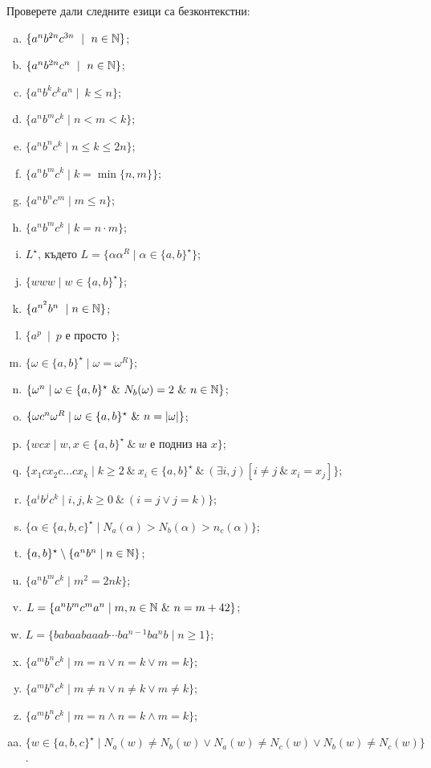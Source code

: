 \begin{problem}
  Проверете дали следните езици са безконтекстни:
  \begin{enumerate}[a)]
  \item
    $\{a^nb^{2n}c^{3n}\ \mid\ n\in\Nat\}$;
  \item
    $\{a^nb^{2n}c^{n}\ \mid\ n\in\Nat\}$;
  \item
    $\{a^nb^kc^ka^n\mid\ k \leq n\}$;
  \item
    $\{a^nb^mc^k\mid n < m < k\}$;
  \item
    $\{a^nb^nc^k\mid n \leq k \leq 2n\}$;
  \item
    $\{a^nb^mc^k\mid k = \min\{n,m\}\}$;
  \item
    $\{a^nb^nc^m\mid m \leq n\}$;
  \item
    $\{a^nb^mc^k\mid k = n\cdot m\}$;
  \item
    $L^\star$, където
    $L = \{\alpha\alpha^R \mid \alpha \in \{a,b\}^\star\}$;
  \item
    $\{www\mid w\in \{a,b\}^\star\}$;
  \item
    $\{a^{n^2}b^n\ \mid n \in \mathbb{N}\}$;
  \item
    $\{a^p\ \mid\ p\mbox{ е просто }\}$;
  \item
    $\{\omega \in \{a,b\}^\star \mid \omega = \omega^R\}$;
  \item
    $\{\omega^n \mid \omega \in \{a,b\}^\star\ \&\ N_b(\omega) = 2\ \&\ n \in \mathbb{N}\}$;
  \item
    $\{\omega c^n \omega^R \mid \omega \in \{a,b\}^\star\ \&\ n = \lvert{\omega}\rvert\}$;
  \item
    $\{w c x\mid w,x\in \{a,b\}^\star\ \&\ w\mbox{ е подниз на }x\}$;
  \item
    $\{x_1 c x_2 c \dots c x_k\mid k\geq 2\ \&\ x_i\in\{a,b\}^\star\ \&\ (\exists i,j)[i \neq j\ \&\ x_i = x_j]\}$;
  \item
    $\{a^ib^jc^k\mid i,j,k\geq 0\ \&\ (i = j \vee j = k)\}$;
  \item
    $\{\alpha \in \{a,b,c\}^\star\mid N_a(\alpha) > N_b(\alpha) > n_c(\alpha)\}$;
  \item
    $\{a,b\}^\star \setminus \{a^nb^n\mid n\in \mathbb{N}\}$;
  \item
    $\{a^nb^mc^k \mid m^2 = 2nk\}$;

  \item
    $L = \{a^nb^mc^ma^n \mid m,n\in\Nat\ \&\ n = m+42\}$;
  \item
    $L = \{babaabaaab\cdots ba^{n-1}ba^nb \mid n \geq 1\}$;
  \item
    $\{a^mb^nc^k\mid m = n \vee n = k \vee m = k\}$;
  \item
    $\{a^mb^nc^k\mid m \neq n \vee n \neq k \vee m \neq k\}$;
  \item
    $\{a^mb^nc^k\mid m = n \wedge n = k \wedge m = k\}$;
  \item
    $\{w \in \{a,b,c\}^\star\mid N_a(w) \neq N_b(w) \vee N_a(w) \neq N_c(w) \vee N_b(w) \neq N_c(w)\}$.
  \end{enumerate}
\end{problem}

